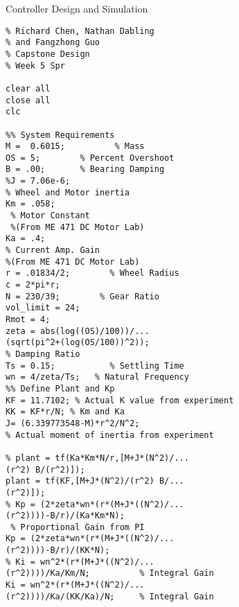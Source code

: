 \item{Controller Design and Simulation}
\begin{verbatim}
% Richard Chen, Nathan Dabling 
% and Fangzhong Guo 
% Capstone Design
% Week 5 Spr

clear all
close all
clc

%% System Requirements
M =  0.6015;          % Mass
OS = 5;        % Percent Overshoot
B = .00;       % Bearing Damping
%J = 7.06e-6;      
% Wheel and Motor inertia
Km = .058;      
 % Motor Constant 
 %(From ME 471 DC Motor Lab)
Ka = .4;       
% Current Amp. Gain 
%(From ME 471 DC Motor Lab)
r = .01834/2;        % Wheel Radius
c = 2*pi*r;
N = 230/39;        % Gear Ratio
vol_limit = 24;
Rmot = 4;
zeta = abs(log((OS)/100))/...
(sqrt(pi^2+(log(OS/100))^2));    
% Damping Ratio
Ts = 0.15;           % Settling Time
wn = 4/zeta/Ts;   % Natural Frequency
%% Define Plant and Kp
KF = 11.7102; % Actual K value from experiment
KK = KF*r/N; % Km and Ka
J= (6.339773548-M)*r^2/N^2; 
% Actual moment of inertia from experiment

% plant = tf(Ka*Km*N/r,[M+J*(N^2)/...
(r^2) B/(r^2)]);
plant = tf(KF,[M+J*(N^2)/(r^2) B/...
(r^2)]);
% Kp = (2*zeta*wn*(r*(M+J*((N^2)/...
(r^2))))-B/r)/(Ka*Km*N);       
 % Proportional Gain from PI
Kp = (2*zeta*wn*(r*(M+J*((N^2)/...
(r^2))))-B/r)/(KK*N);
% Ki = wn^2*(r*(M+J*((N^2)/...
(r^2))))/Ka/Km/N;          % Integral Gain
Ki = wn^2*(r*(M+J*((N^2)/...
(r^2))))/Ka/(KK/Ka)/N;     % Integral Gain


\end{verbatim}
